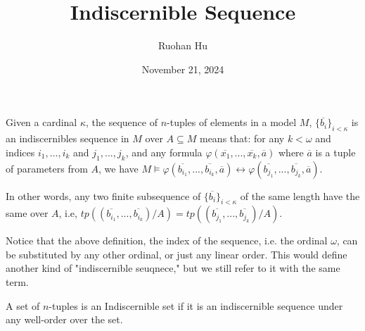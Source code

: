 \documentclass[a4paper]{article}
\title{Indiscernible Sequence}
\date{November 21, 2024}
\author{Ruohan Hu}
\begin{document}
\maketitle
\par{

Given a cardinal \(\kappa\), the sequence of \(n\)-tuples of elements in a model \(M\), \(\{ \overline {b_i} \} _{i< \kappa }\) is an indiscernibles sequence in \(M\) over \(A \subseteq  M\) means that: for any \(k< \omega\) and indices \(i_1,...,i_k\) and \(j_1,...,j_k\), and any formula \(\varphi ( \overline {x_1},..., \overline {x_k}, \overline {a})\) where \(\overline {a}\) is a tuple of parameters from \(A\), we have \(M \models   \varphi ( \overline {b_{i_1}},..., \overline {b_{i_k}}, \overline {a}) \leftrightarrow   \varphi ( \overline {b_{j_1}},..., \overline {b_{j_k}}, \overline {a})\).

In other words, any two finite subsequence of \(\{ \overline {b_i} \} _{i< \kappa }\) of the same length have the same  over \(A\), i.e, \(tp(( \overline {b_{i_1}},..., \overline {b_{i_k}})/A)=tp(( \overline {b_{j_1}},..., \overline {b_{j_k}})/A)\). 

Notice that the above definition, the index of the sequence, i.e. the ordinal \(\omega\), can be substituted by any other ordinal, or just any linear order. This would define another kind of "indiscernible seuqnece," but we still refer to it with the same term.

A set of \(n\)-tuples is an Indiscernible set if it is an indiscernible sequence under any well-order over the set.
}
\printbibliography
\end{document}
